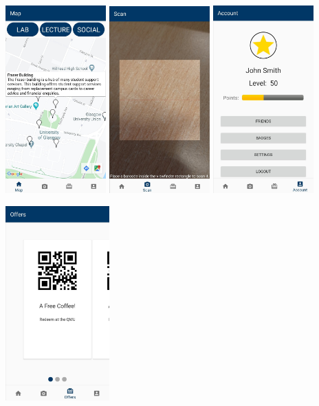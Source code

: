 \documentclass[10pt,twocolumn]{article} %
\begin{document}
\vspace*{25px}
\includegraphics[width=0.29\textwidth]{./figures/demonstrator/demo4.jpg}\hfill
\includegraphics[width=0.29\textwidth]{./figures/demonstrator/demo3.jpg}\hfill
\includegraphics[width=0.29\textwidth]{./figures/demonstrator/demo5.jpg}\hfill

\newpage

\includegraphics[width=0.3\textwidth]{./figures/demonstrator/demo7.jpg}
\vfill    
\end{document}
